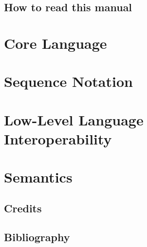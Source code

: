 \documentclass[11pt]{book}
\begin{document}
\chapter{How to read this manual}


\mainmatter

\part{Core Language}


\part{Sequence Notation}


\part{Low-Level Language Interoperability}


\part{Semantics}


\appendix

\stopcontents

\chapter*{Credits}\label{cha:credits}


\chapter*{Bibliography}
\printbibliography[heading=bibempty]
\end{document}
